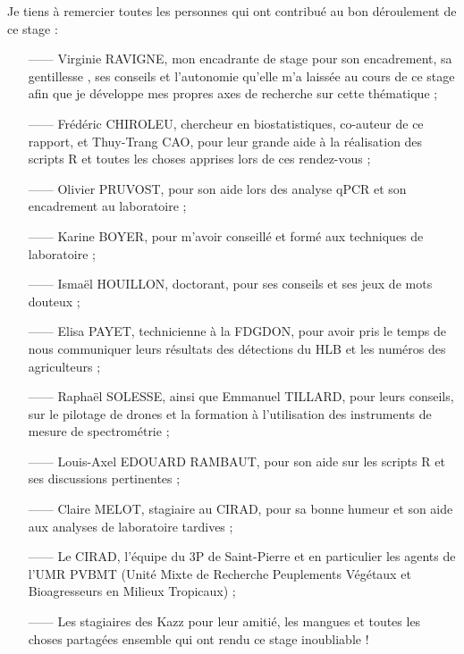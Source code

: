 \documentclass[
  11pt,
  french,
  a4paper,
  extrafontsizes,onecolumn,openright
  ]{memoir}
\begin{document}
Je tiens à remercier toutes les personnes qui ont contribué au bon déroulement de ce stage :

\begin{small}
\begin{itemize}

\item[——] Virginie RAVIGNE, mon encadrante de stage pour son encadrement, sa gentillesse , ses conseils et l'autonomie qu'elle m'a laissée au cours de ce stage afin que je développe mes propres axes de recherche sur cette thématique ;

\item[——] Frédéric CHIROLEU, chercheur en biostatistiques, co-auteur de ce rapport, et Thuy-Trang CAO, pour leur grande aide à la réalisation des scripts R et toutes les choses apprises lors de ces rendez-vous ;

\item[——] Olivier PRUVOST,  pour son aide lors des analyse qPCR et son encadrement au laboratoire ;

\item[——] Karine BOYER, pour m’avoir conseillé et formé aux techniques de laboratoire ;

\item[——] Ismaël HOUILLON, doctorant, pour ses conseils et ses jeux de mots douteux ;

\item[——] Elisa PAYET, technicienne à la FDGDON, pour avoir pris le temps de nous communiquer leurs résultats des détections du HLB et les numéros des agriculteurs ;

\item[——] Raphaël SOLESSE, ainsi que Emmanuel TILLARD, pour leurs conseils, sur le pilotage de drones et la formation à l’utilisation des instruments de mesure de spectrométrie ;

\item[——] Louis-Axel EDOUARD RAMBAUT, pour son aide sur les scripts R et ses discussions pertinentes ;

\item[——] Claire MELOT, stagiaire au CIRAD, pour sa bonne humeur et son aide aux analyses de laboratoire tardives ;

\item[——] Le CIRAD, l’équipe du 3P de Saint-Pierre et en particulier les agents de l’UMR PVBMT (Unité Mixte de 
Recherche Peuplements Végétaux et Bioagresseurs en Milieux Tropicaux) ;

\item[——] Les stagiaires des Kazz pour leur amitié, les mangues et toutes les choses partagées ensemble qui ont rendu ce stage inoubliable !

\end{itemize}
\end{small}
\end{document}
